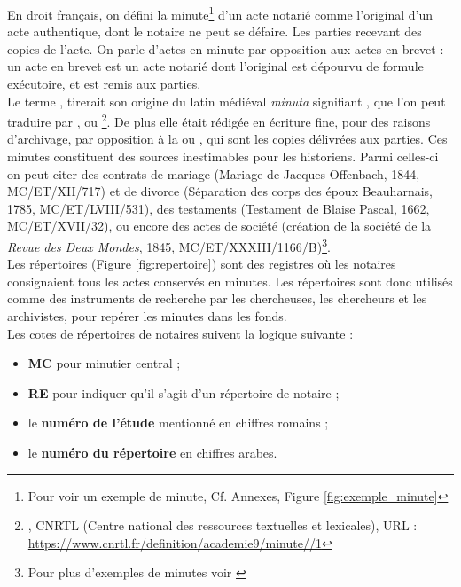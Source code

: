 En droit français, on défini la minute\footnote{Pour voir un exemple de minute, Cf. Annexes, Figure \ref{fig:exemple_minute}} d'un acte notarié comme l'original d'un acte authentique, dont le notaire ne peut se défaire. Les parties recevant des copies de l'acte. On parle d'actes en minute par opposition aux actes en brevet : un acte en brevet est un acte notarié dont l'original est dépourvu de formule exécutoire, et est remis aux parties.\\
\newpage
Le terme , tirerait son origine du latin médiéval \textit{minuta} signifiant , que l'on peut traduire par ,  ou \footnote{, CNRTL (Centre national des ressources textuelles et lexicales), URL : \url{https://www.cnrtl.fr/definition/academie9/minute//1}}. De plus elle était rédigée en écriture fine, pour des raisons d'archivage, par opposition à la  ou , qui sont les copies délivrées aux parties. Ces minutes constituent des sources inestimables pour les historiens. Parmi celles-ci on peut citer des contrats de mariage (Mariage de Jacques Offenbach, 1844, MC/ET/XII/717) et de divorce (Séparation des corps des époux Beauharnais, 1785, MC/ET/LVIII/531), des testaments (Testament de Blaise Pascal, 1662, MC/ET/XVII/32), ou encore des actes de société (création de la société de la \textit{Revue des Deux Mondes}, 1845, MC/ET/XXXIII/1166/B)\footnote{Pour plus d'exemples de minutes voir \cite{limon-bonnet_122_2012}}.\\

Les répertoires (Figure \ref{fig:repertoire}) sont des registres où les notaires consignaient tous les actes conservés en minutes. Les répertoires sont donc utilisés comme des instruments de recherche par les chercheuses, les chercheurs et les archivistes, pour repérer les minutes dans les fonds.\\

Les cotes de répertoires de notaires suivent la logique suivante :
\begin{itemize}
    \item \textbf{MC} pour minutier central ;
    \item \textbf{RE} pour indiquer qu'il s'agit d'un répertoire de notaire ;
    \item le \textbf{numéro de l'étude} mentionné en chiffres romains ;
    \item le \textbf{numéro du répertoire} en chiffres arabes.
\end{itemize}


